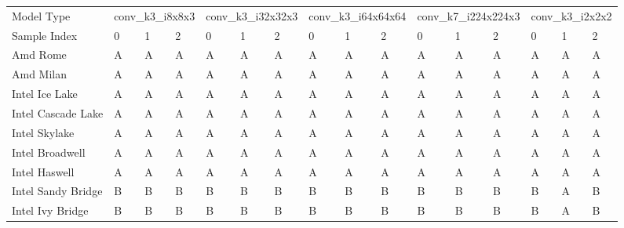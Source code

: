 \begin{tabular}{llllllllllllllll}
\toprule
Model Type & \multicolumn{3}{l}{conv\_k3\_i8x8x3} & \multicolumn{3}{l}{conv\_k3\_i32x32x3} & \multicolumn{3}{l}{conv\_k3\_i64x64x64} & \multicolumn{3}{l}{conv\_k7\_i224x224x3} & \multicolumn{3}{l}{conv\_k3\_i2x2x2} \\
Sample Index &              0 &  1 &  2 &                0 &  1 &  2 &                 0 &  1 &  2 &                  0 &  1 &  2 &              0 &  1 &  2 \\
\midrule
Amd Rome           &              A &  A &  A &                A &  A &  A &                 A &  A &  A &                  A &  A &  A &              A &  A &  A \\
Amd Milan          &              A &  A &  A &                A &  A &  A &                 A &  A &  A &                  A &  A &  A &              A &  A &  A \\
Intel Ice Lake     &              A &  A &  A &                A &  A &  A &                 A &  A &  A &                  A &  A &  A &              A &  A &  A \\
Intel Cascade Lake &              A &  A &  A &                A &  A &  A &                 A &  A &  A &                  A &  A &  A &              A &  A &  A \\
Intel Skylake      &              A &  A &  A &                A &  A &  A &                 A &  A &  A &                  A &  A &  A &              A &  A &  A \\
Intel Broadwell    &              A &  A &  A &                A &  A &  A &                 A &  A &  A &                  A &  A &  A &              A &  A &  A \\
Intel Haswell      &              A &  A &  A &                A &  A &  A &                 A &  A &  A &                  A &  A &  A &              A &  A &  A \\
Intel Sandy Bridge &              B &  B &  B &                B &  B &  B &                 B &  B &  B &                  B &  B &  B &              B &  A &  B \\
Intel Ivy Bridge   &              B &  B &  B &                B &  B &  B &                 B &  B &  B &                  B &  B &  B &              B &  A &  B \\
\bottomrule
\end{tabular}
